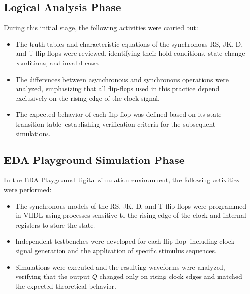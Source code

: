 \documentclass[12pt]{article}  %
\begin{document}
\subsection{Logical Analysis Phase}
During this initial stage, the following activities were carried out:
\begin{itemize}
    \item The truth tables and characteristic equations of the synchronous RS, JK, D, and T flip-flops were reviewed, identifying their hold conditions, state-change conditions, and invalid cases.
    \item The differences between asynchronous and synchronous operations were analyzed, emphasizing that all flip-flops used in this practice depend exclusively on the rising edge of the clock signal.
    \item The expected behavior of each flip-flop was defined based on its state-transition table, establishing verification criteria for the subsequent simulations.
\end{itemize}

\subsection{EDA Playground Simulation Phase}
In the EDA Playground digital simulation environment, the following activities were performed:
\begin{itemize}
    \item The synchronous models of the RS, JK, D, and T flip-flops were programmed in VHDL using processes sensitive to the rising edge of the clock and internal registers to store the state.
    \item Independent testbenches were developed for each flip-flop, including clock-signal generation and the application of specific stimulus sequences.
    \item Simulations were executed and the resulting waveforms were analyzed, verifying that the output $Q$ changed only on rising clock edges and matched the expected theoretical behavior.
\end{itemize}
\end{document}
